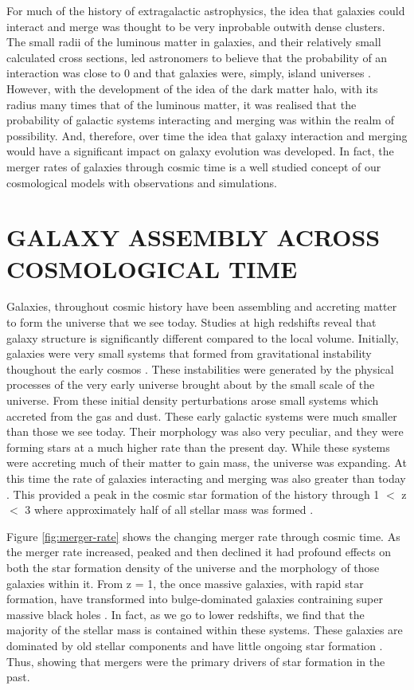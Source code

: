 For much of the history of extragalactic astrophysics, the idea that galaxies could interact and merge was thought to be very inprobable outwith dense clusters. The small radii of the luminous matter in galaxies, and their relatively small calculated cross sections, led astronomers to believe that the probability of an interaction was close to 0 and that galaxies were, simply, island universes  \citep{1926ApJ....64..321H}. However, with the development of the idea of the dark matter halo, with its radius many times that of the luminous matter, it was realised that the probability of galactic systems interacting and merging was within the realm of possibility. And, therefore, over time the idea that galaxy interaction and merging would have a significant impact on galaxy evolution was developed. In fact, the merger rates of galaxies through cosmic time is a well studied concept of our cosmological models with observations and simulations.

\section{GALAXY ASSEMBLY ACROSS COSMOLOGICAL TIME}
\noindent Galaxies, throughout cosmic history have been assembling and accreting matter to form the universe that we see today. Studies at high redshifts reveal that galaxy structure is significantly different compared to the local volume. Initially, galaxies were very small systems that formed from gravitational instability thoughout the early cosmos \citep{1993MNRAS.262..627L}. These instabilities were generated by the physical processes of the very early universe brought about by the small scale of the universe. From these initial density perturbations arose small systems which accreted from the gas and dust. These early galactic systems were much smaller than those we see today. Their morphology was also very peculiar, and they were forming stars at a much higher rate than the present day. While these systems were accreting much of their matter to gain mass, the universe was expanding. At this time the rate of galaxies interacting and merging was also greater than today \citep{2010ApJ...715..202H, 2011ApJ...742..103L}. This provided a peak in the cosmic star formation of the history through 1 $<$ z $<$ 3 where approximately half of all stellar mass was formed \citep{2005ApJ...625..621B}.

Figure \ref{fig:merger-rate} shows the changing merger rate through cosmic time. As the merger rate increased, peaked and then declined it had profound effects on both the star formation density of the universe and the morphology of those galaxies within it. From z = 1, the once massive galaxies, with rapid star formation, have transformed into bulge-dominated galaxies contraining super massive black holes \citep{2007ApJ...654..858B}. In fact, as we go to lower redshifts, we find that the majority of the stellar mass is contained within these systems. These galaxies are dominated by old stellar components and have little ongoing star formation \citep{2002AJ....124..646H, 2004ApJ...608..752B}. Thus, showing that mergers were the primary drivers of star formation in the past. 

